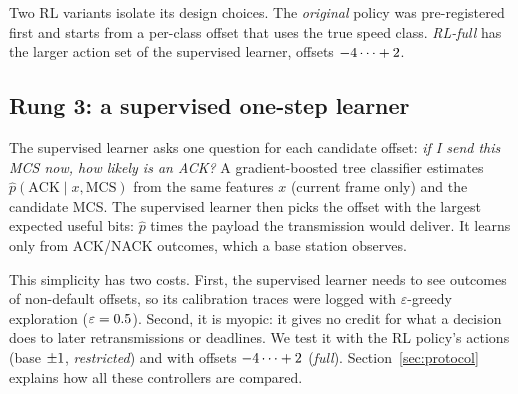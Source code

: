 Two RL variants isolate its design choices. The \emph{original} policy was pre-registered first and starts from a per-class offset that uses the true speed class. \emph{RL-full} has the larger action set of the supervised learner, offsets $-4\dots+2$.

\subsection{Rung 3: a supervised one-step learner}
The supervised learner asks one question for each candidate offset: \emph{if I send this MCS now, how likely is an ACK?} A gradient-boosted tree classifier estimates $\hat p(\mathrm{ACK}\mid x,\mathrm{MCS})$ from the same  features $x$ (current frame only) and the candidate MCS. The supervised learner then picks the offset with the largest expected useful bits: $\hat p$ times the payload the transmission would deliver. It learns only from ACK/NACK outcomes, which a base station observes.

This simplicity has two costs. First, the supervised learner needs to see outcomes of non-default offsets, so its calibration traces were logged with $\varepsilon$-greedy exploration ($\varepsilon=0.5$). Second, it is myopic: it gives no credit for what a decision does to later retransmissions or deadlines. We test it with the RL policy's actions (base $\pm1$, \emph{restricted}) and with offsets $-4\dots+2$ (\emph{full}). Section~\ref{sec:protocol} explains how all these controllers are compared.

